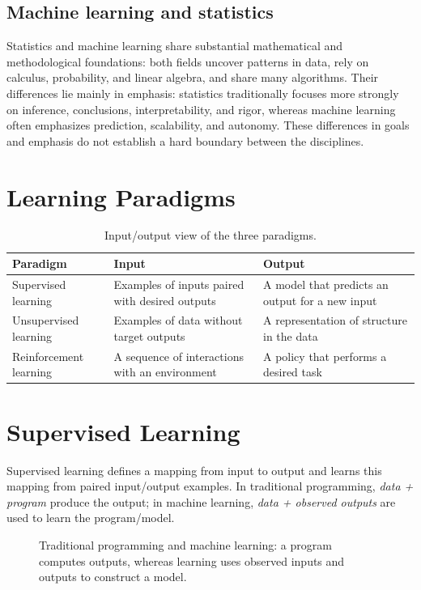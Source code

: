 \documentclass[11pt,a4paper]{article}
\begin{document}
\subsection{Machine learning and statistics}
Statistics and machine learning share substantial mathematical and methodological foundations: both fields uncover patterns in data, rely on calculus, probability, and linear algebra, and share many algorithms. Their differences lie mainly in emphasis: statistics traditionally focuses more strongly on inference, conclusions, interpretability, and rigor, whereas machine learning often emphasizes prediction, scalability, and autonomy. These differences in goals and emphasis do not establish a hard boundary between the disciplines.

\section{Learning Paradigms}

\begin{table}[htbp]
\centering
\caption{Input/output view of the three paradigms.}
\begin{tabularx}{\textwidth}{@{}p{}YY@{}}
\toprule
\textbf{Paradigm} & \textbf{Input} & \textbf{Output}\\
\midrule
Supervised learning & Examples of inputs paired with desired outputs & A model that predicts an output for a new input\\
Unsupervised learning & Examples of data without target outputs & A representation of structure in the data\\
Reinforcement learning & A sequence of interactions with an environment & A policy that performs a desired task\\
\bottomrule
\end{tabularx}
\end{table}

\section{Supervised Learning}
Supervised learning defines a mapping from input to output and learns this mapping from paired input/output examples. In traditional programming, \emph{data + program} produce the output; in machine learning, \emph{data + observed outputs} are used to learn the program/model.

\begin{figure}[htbp]
\centering\programmingdiagram
\caption{Traditional programming and machine learning: a program computes outputs, whereas learning uses observed inputs and outputs to construct a model.}
\end{figure}
\end{document}
